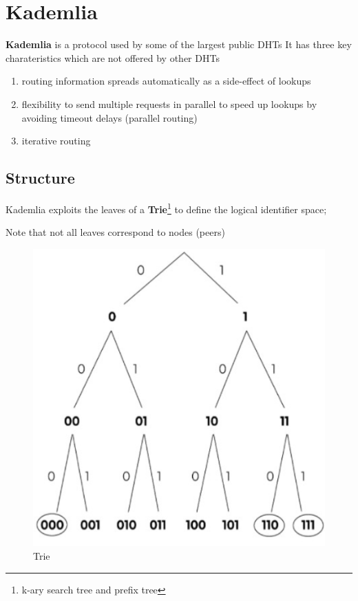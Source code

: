 \chapter{Kademlia}
\textbf{Kademlia} is a protocol used by some of the largest public DHTs
It has three key charateristics which are not offered by other DHTs
\begin{enumerate}
   \item routing information spreads automatically as a side-effect of lookups
   \item flexibility to send multiple requests in parallel to speed up lookups by
   avoiding timeout delays (parallel routing)
   \item iterative routing
\end{enumerate}

\section{Structure}
\begin{paracol}{2}
   \colfill
   Kademlia exploits the leaves of a \textbf{Trie}\footnote{k-ary search tree and prefix tree} to define the logical identifier space;

   Note that not all leaves correspond to nodes (peers)
   \colfill
   \switchcolumn

   \begin{figure}[htbp]
      \centering
      \includegraphics{images/kademlia_trie.png}
      \caption{Trie}
      \label{fig:kademlia_trie}
   \end{figure}
\end{paracol}

